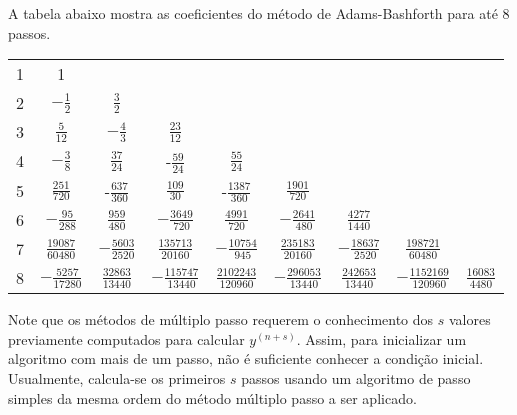 A tabela abaixo mostra as coeficientes do método de Adams-Bashforth para até 8 passos.
 \begin{center}
\begin{tabular}{|c|cccccccc|}
\hline
1 & 1 &&&&&&&\\
2 & $-\frac{1}{2}$ & $\frac{3}{2}$&&&&&&\\
3 & $\frac{5}{12}$ & $-\frac{4}{3}$ & $\frac{23}{12}$&&&&&\\
4 & $-\frac{3}{8}$ & $\frac{37}{24}$ & -$\frac{59}{24}$ & $\frac{55}{24}$&&&&\\
5 & $\frac{251}{720}$ & -$\frac{637}{360}$ & $\frac{109}{30}$& -$\frac{1387}{360}$& $\frac{1901}{720}$&&&\\
6 & $-{\frac {95}{288}}$ & ${\frac {959}{480}}$ & $-{\frac {3649}{720}}$ & ${\frac {4991}{720}}$ & $-{\frac {2641}{480}}$ & $\frac {4277}{1440}$&&\\
7 & $\frac {19087}{60480}$ & $-{\frac {5603}{2520}}$ & ${\frac {135713}{20160}}$ & $-{\frac {10754}{945}}$ & ${\frac {235183}{20160}}$ & $-{\frac {18637}{2520}}$ & ${\frac {198721}{60480}}$&\\
8 & $-{\frac {5257}{17280}}$&${\frac {32863}{13440}}$&$-{\frac {115747}{13440}}$&${\frac {2102243}{120960}}$&$-{\frac {296053}{13440}}$&${\frac {242653}{13440}}$&$-{\frac {1152169}{120960}}$&${\frac {16083}{4480}}$\\
\hline
\end{tabular}
 \end{center}
\begin{obs} Note que os métodos de múltiplo passo requerem o conhecimento dos $s$ valores previamente computados para calcular $y^{(n+s)}$. Assim, para inicializar um algoritmo com mais de um passo, não é suficiente conhecer a condição inicial. Usualmente, calcula-se os primeiros $s$ passos usando um algoritmo de passo simples da mesma ordem do método múltiplo passo a ser aplicado.
\end{obs}




